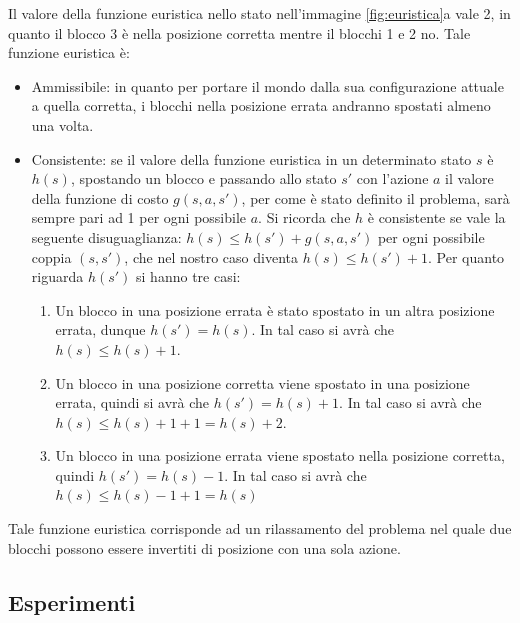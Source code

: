 \documentclass{article}
\begin{document}
	\noindent Il valore della funzione euristica nello stato nell'immagine \ref{fig:euristica}a vale 2, in quanto il blocco 3 è nella posizione corretta mentre il blocchi 1 e 2 no. Tale funzione euristica è:
	\begin{itemize}
		\item Ammissibile: in quanto per portare il mondo dalla sua configurazione attuale a quella corretta, i blocchi nella posizione errata andranno spostati almeno una volta.
		\item Consistente: se il valore della funzione euristica in un determinato stato $s$ è $h(s)$, spostando un blocco e passando allo stato $s'$ con l'azione $a$ il valore della funzione di costo $g(s,a,s')$, per come è stato definito il problema, sarà sempre pari ad 1 per ogni possibile $a$. Si ricorda che $h$ è consistente se vale la seguente disuguaglianza: 
		$h(s) \leq h(s') + g(s,a, s')$ per ogni possibile coppia $(s,s')$, che nel nostro caso diventa $h(s) \leq h(s') + 1$. Per quanto riguarda $h(s')$ si hanno tre casi: 
		\begin{enumerate}
			\item Un blocco in una posizione errata è stato spostato in un altra posizione errata, dunque $h(s') = h(s)$. In tal caso si avrà che $h(s) \leq h(s) + 1$.
			\item Un blocco in una posizione corretta viene spostato in una posizione errata, quindi si avrà che $h(s') = h(s) + 1$. In tal caso si avrà che $h(s) \leq h(s) + 1 + 1 = h(s) + 2$.
			\item Un blocco in una posizione errata viene spostato nella posizione corretta, quindi $h(s') = h(s) - 1$. In tal caso si avrà che $h(s) \leq h(s) - 1 + 1 = h(s)$
		\end{enumerate}
	\end{itemize}
	Tale funzione euristica corrisponde ad un rilassamento del problema nel quale due blocchi possono essere invertiti di posizione con una sola azione.
	
	\subsection{Esperimenti}
\end{document}
